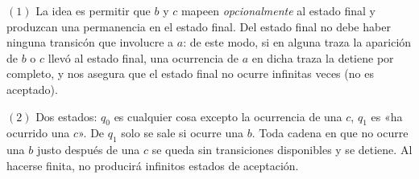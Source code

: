 \documentclass[a4paper, 12pt]{article}
\begin{document}
$(1)$ La idea es permitir que $b$ y $c$ mapeen \textit{opcionalmente} al estado
final y produzcan una permanencia en el estado final. Del estado final no debe
haber ninguna transicón que involucre a $a$: de este modo, si en alguna traza la
aparición de $b$ o $c$ llevó al estado final, una ocurrencia de $a$ en dicha
traza la detiene por completo, y nos asegura que el estado final no ocurre
infinitas veces (no es aceptado).

\begin{center}

\end{center}

$(2)$ Dos estados: $q_0$ es cualquier cosa excepto la ocurrencia de una $c$,
$q_1$ es «ha ocurrido una $c$». De $q_1$ solo se sale si ocurre una $b$. Toda
cadena en que no ocurre una $b$ justo después de una $c$ se queda sin
transiciones disponibles y se detiene. Al hacerse finita, no producirá infinitos
estados de aceptación.
\end{document}
